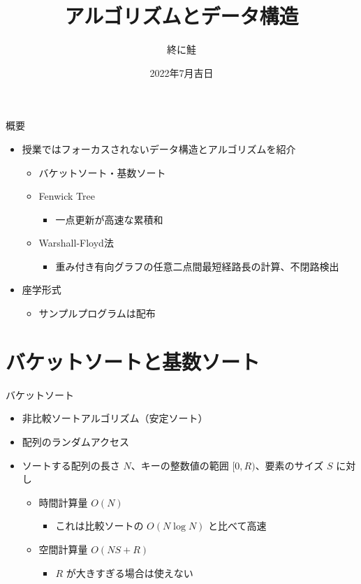 \documentclass[t,aspectratio=169,autodetect-engine,ja=standard]{beamer}
\title{アルゴリズムとデータ構造}
\author{終に鮭}
\institute{電子計算機研究会}
\date[2022/7/xx]{2022年7月吉日}
\begin{document}
\frame{\titlepage}

\begin{frame}{概要}
\begin{itemize}
    \item 授業ではフォーカスされないデータ構造とアルゴリズムを紹介
        \begin{itemize}
            \item バケットソート・基数ソート
            \item Fenwick Tree
                \begin{itemize}
                    \item 一点更新が高速な累積和
                \end{itemize}
            \item Warshall-Floyd法
                \begin{itemize}
                    \item 重み付き有向グラフの任意二点間最短経路長の計算、不閉路検出
                \end{itemize}
        \end{itemize}
    \item 座学形式
        \begin{itemize}
            \item サンプルプログラムは配布
        \end{itemize}
\end{itemize}
\end{frame}

\section{バケットソートと基数ソート}
\frame{\sectionpage}

\begin{frame}{バケットソート}
\begin{itemize}
    \item 非比較ソートアルゴリズム（安定ソート）
    \item 配列のランダムアクセス
    \item ソートする配列の長さ $N$、キーの整数値の範囲 $[0,R)$、要素のサイズ $S$ に対し
        \begin{itemize}
            \item 時間計算量 $O(N)$
                \begin{itemize}
                    \item これは比較ソートの $O(N \log N)$ と比べて高速
                \end{itemize}
            \item 空間計算量 $O(NS+R)$
                \begin{itemize}
                    \item $R$ が大きすぎる場合は使えない
                \end{itemize}
        \end{itemize}
\end{itemize}
\end{frame}
\end{document}
